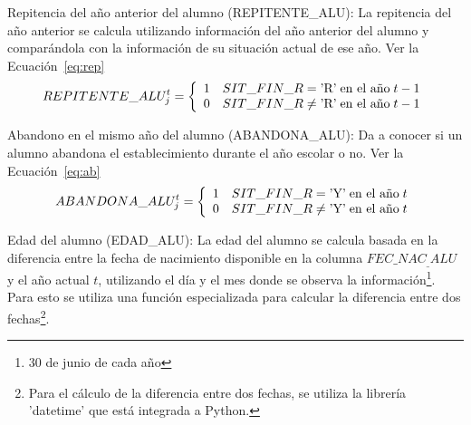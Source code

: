 \begin{longdescription}
\begin{longdescription}
              \item[Repitencia del año anterior del alumno] (REPITENTE\_ALU): La repitencia del año anterior se calcula utilizando información del año anterior del alumno y comparándola con la información de su situación actual de ese año. Ver la Ecuación~\ref{eq:rep}
              \begin{equation}
              \centering
              REPITENTE\_ALU_{j}^{t} = \left\{
                \begin{array}{c l}
                 1 & SIT\_FIN\_R = \mbox{'R'}  \; \mbox{en el año} \; t - 1\\
                 0 & SIT\_FIN\_R \neq \mbox{'R'} \; \mbox{en el año} \; t - 1
                \end{array}
                \right.
                \label{eq:rep}
              \end{equation}
              \item[Abandono en el mismo año del alumno] (ABANDONA\_ALU): Da a conocer si un alumno abandona el establecimiento durante el año escolar o no. Ver la Ecuación~\ref{eq:ab}
              \begin{equation}
              \centering
              ABANDONA\_ALU_{j}^{t} = \left\{
                \begin{array}{c l}
                 1 & SIT\_FIN\_R = \mbox{'Y'}  \; \mbox{en el año} \; t\\
                 0 & SIT\_FIN\_R \neq \mbox{'Y'} \; \mbox{en el año} \; t
                \end{array}
                \right.
                \label{eq:ab}
              \end{equation}
              \item[Edad del alumno] (EDAD\_ALU): La edad del alumno se calcula basada en la diferencia entre la fecha de nacimiento disponible en la columna $FEC\_NAC_\_ALU$ y el año actual $t$, utilizando el día y el mes donde se observa la información\footnote{30 de junio de cada año}. Para esto se utiliza una función especializada para calcular la diferencia entre dos fechas\footnote{Para el cálculo de la diferencia entre dos fechas, se utiliza la librería 'datetime' que está integrada a Python.}.
             

\end{longdescription}
\end{longdescription}
